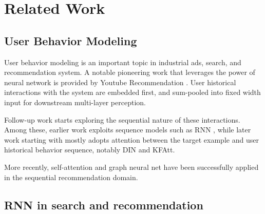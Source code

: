 \section{Related Work}
\label{sec:related_work}


\subsection{User Behavior Modeling}
\label{subsec:rw:user}

User behavior modeling is an important topic in industrial ads, search, and recommendation system. A notable pioneering work that leverages the power of neural network is provided by Youtube Recommendation \cite{covington2016deep}. User historical interactions with the system are embedded first, and sum-pooled into fixed width input for downstream multi-layer perception. 

Follow-up work starts exploring the sequential nature of these interactions. Among these, earlier work exploits sequence models such as RNN \cite{hidasi2015session}, while later work starting with \cite{li2017neural} mostly adopts attention between the target example and user historical behavior sequence, notably DIN \cite{zhou2018deep} and KFAtt\cite{liu2020kalman}. 

More recently, self-attention \cite{kang2018self} and graph neural net \cite{wu2019session,pang2021heterogeneous} have been successfully applied in the sequential recommendation domain. 






\subsection{RNN in search and recommendation}
\label{subsec:rw:rnn}

